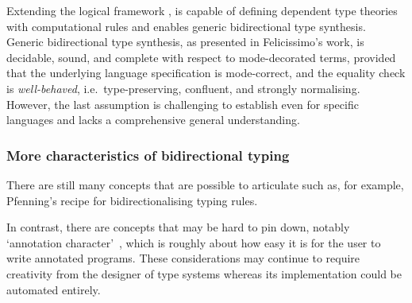 Extending the logical framework \Dedukti,  is capable of defining dependent type theories with computational rules and enables generic bidirectional type synthesis.
Generic bidirectional type synthesis, as presented in Felicissimo's work, is decidable, sound, and complete with respect to mode-decorated terms, provided that the underlying language specification is mode-correct, and the equality check is \emph{well-behaved}, i.e.\ type-preserving, confluent, and strongly normalising.
However, the last assumption is challenging to establish even for specific languages and lacks a comprehensive general understanding.


\subsubsection{More characteristics of bidirectional typing}

There are still many concepts that are possible to articulate such as, for example, Pfenning's recipe for bidirectionalising typing rules.

In contrast, there are concepts that may be hard to pin down, notably `annotation character'~\cite{Dunfield2021}, which is roughly about how easy it is for the user to write annotated programs.
These considerations may continue to require creativity from the designer of type systems whereas its implementation could be automated entirely.

